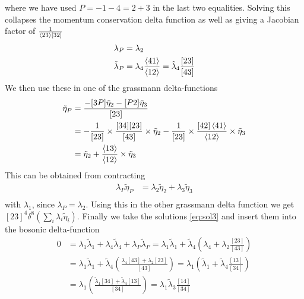 \documentclass[letter,11pt]{article}
\begin{document}
where we have used $P=-1-4=2+3$ in the last two equalities. Solving this collapses the momentum conservation delta function as well as giving a Jacobian factor of $\frac{1}{\expval{23}[32]}$
\begin{equation} \label{eq:sol3}
	\begin{aligned}
		\lambda_P&=\lambda_2\\
		\tilde \lambda_P&=\lambda_4 \frac{\expval{41}}{\expval{12}}=\tilde\lambda_4 \frac{[23]}{[43]}
	\end{aligned}
\end{equation}
We then use these in one of the grassmann delta-functions
\begin{equation}
	\begin{aligned}
		\tilde\eta_{P}&=\frac{-[3P]\tilde\eta_{2}-[P 2]\tilde\eta_{3}}{[23]}\\
		&=-\frac{1}{[23]}\times \frac{[34][23]}{[43]} \times\tilde \eta_2-\frac{1}{[23]}\times \frac{[42]\expval{41}}{\expval{12}} \times\tilde \eta_3\\
		&=\tilde \eta_2+ \frac{\expval{13}}{\expval{12}} \times\tilde \eta_3\\
	\end{aligned}
\end{equation}
This can be obtained from contracting
\begin{equation}
	\begin{aligned}
\lambda_P\tilde\eta_{P}	&=\lambda_2\tilde \eta_2+ \lambda_3 \tilde \eta_3\\	
	\end{aligned}
\end{equation}
 with $\lambda_1$, since $\lambda_P=\lambda_2$. Using this in the other grassmann  delta function we get $[23]^4\delta^8(\sum_i\lambda_i\tilde\eta_i)$. Finally we take the solutions \eqref{eq:sol3} and insert them into the bosonic delta-function
 \begin{equation}
 	\begin{aligned}
 		0&=\lambda_1\tilde\lambda_1+\lambda_4\tilde\lambda_4+\lambda_P\tilde\lambda_P
 		=\lambda_1\tilde\lambda_1+\tilde\lambda_4 \left(\lambda_4+\lambda_2  \frac{[23]}{[43]}\right)
 		\\
 		&=\lambda_1\tilde\lambda_1+\tilde\lambda_4 \left(  \frac{\lambda_4[43]+\lambda_2[23]}{[43]}\right)=\lambda_1 \left(\tilde\lambda_1 +\tilde\lambda_4 \frac{[13]}{[34]}\right)
 			\\
 		&=\lambda_1 \left( \frac{\tilde\lambda_1[34]+\tilde\lambda_4[13]}{[34]}\right)=\lambda_1 \tilde\lambda_3 \frac{[14]}{[34]}
 	\end{aligned}
 \end{equation}
\end{document}
